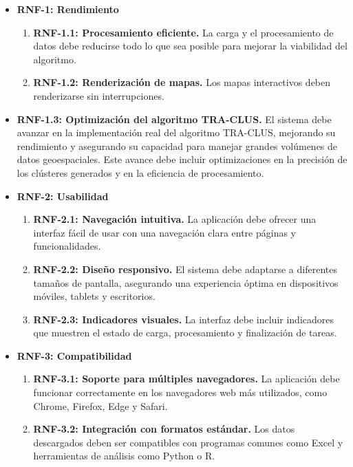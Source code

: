 \begin{itemize}

    \item \textbf{RNF-1: Rendimiento}
    \begin{enumerate}
        \item \textbf{RNF-1.1: Procesamiento eficiente.}  
        La carga y el procesamiento de datos debe reducirse todo lo que sea posible para mejorar la viabilidad del algoritmo.
        \item \textbf{RNF-1.2: Renderización de mapas.}  
        Los mapas interactivos deben renderizarse sin interrupciones.
    \end{enumerate}
        \item \textbf{RNF-1.3: Optimización del algoritmo TRA-CLUS.}  
        El sistema debe avanzar en la implementación real del algoritmo TRA-CLUS, mejorando su rendimiento y asegurando su capacidad para manejar grandes volúmenes de datos geoespaciales. Este avance debe incluir optimizaciones en la precisión de los clústeres generados y en la eficiencia de procesamiento.

    \item \textbf{RNF-2: Usabilidad}
    \begin{enumerate}
        \item \textbf{RNF-2.1: Navegación intuitiva.}  
        La aplicación debe ofrecer una interfaz fácil de usar con una navegación clara entre páginas y funcionalidades.
        \item \textbf{RNF-2.2: Diseño responsivo.}  
        El sistema debe adaptarse a diferentes tamaños de pantalla, asegurando una experiencia óptima en dispositivos móviles, tablets y escritorios.
        \item \textbf{RNF-2.3: Indicadores visuales.}  
        La interfaz debe incluir indicadores que muestren el estado de carga, procesamiento y finalización de tareas.
    \end{enumerate}

    \item \textbf{RNF-3: Compatibilidad}
    \begin{enumerate}
        \item \textbf{RNF-3.1: Soporte para múltiples navegadores.}  
        La aplicación debe funcionar correctamente en los navegadores web más utilizados, como Chrome, Firefox, Edge y Safari.
        \item \textbf{RNF-3.2: Integración con formatos estándar.}  
        Los datos descargados deben ser compatibles con programas comunes como Excel y herramientas de análisis como Python o R.
    \end{enumerate}


\end{itemize}
